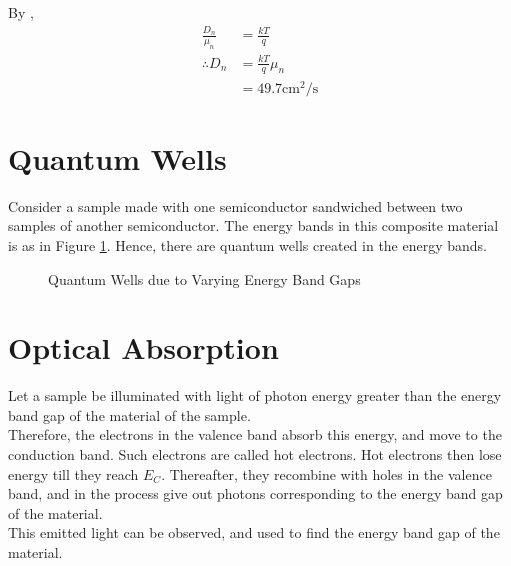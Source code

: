 \documentclass[titlepage, fleqn, a4paper, 12pt, twoside]{article}
\theoremstyle{definition}
\theoremstyle{theorem}
\let\Oldsection\section
\renewcommand{\section}{\FloatBarrier\Oldsection}
\begin{document}
\begin{solution}
	By ,
	\begin{align*}
		\frac{D_n}{\mu_n} &= \frac{k T}{q}\\
		\therefore D_n &= \frac{k T}{q} \mu_n\\
		&= 49.7 \si{\centi\metre\squared\per\second}
	\end{align*}
\end{solution}

\section{Quantum Wells}

Consider a sample made with one semiconductor sandwiched between two samples of another semiconductor.
The energy bands in this composite material is as in Figure \ref{fig:Quantum_Wells_due_to_Varying_Energy_Band_Gaps}.
Hence, there are quantum wells created in the energy bands.

\begin{figure}[h]
	\centering
	\caption{Quantum Wells due to Varying Energy Band Gaps}
	\label{fig:Quantum_Wells_due_to_Varying_Energy_Band_Gaps}
\end{figure}

\section{Optical Absorption}

Let a sample be illuminated with light of photon energy greater than the energy band gap of the material of the sample.\\
Therefore, the electrons in the valence band absorb this energy, and move to the conduction band.
Such electrons are called hot electrons.
Hot electrons then lose energy till they reach $E_C$.
Thereafter, they recombine with holes in the valence band, and in the process give out photons corresponding to the energy band gap of the material.\\
This emitted light can be observed, and used to find the energy band gap of the material.
\end{document}

